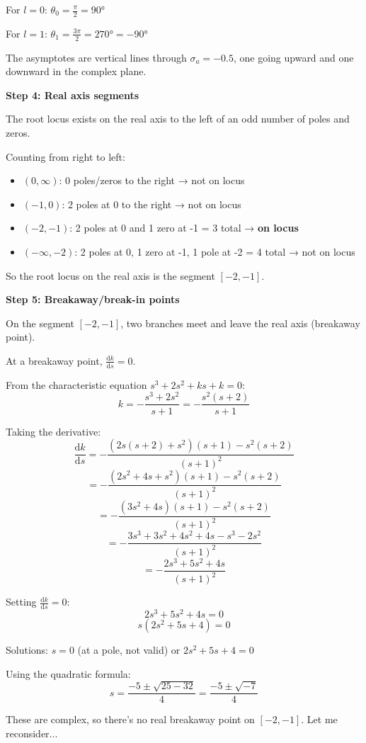 \documentclass[11pt,a4paper]{article}
\begin{document}
For $l = 0$: $\theta_0 = \frac{\pi}{2} = 90°$

For $l = 1$: $\theta_1 = \frac{3\pi}{2} = 270° = -90°$

The asymptotes are vertical lines through $\sigma_a = -0.5$, one going upward and one downward in the complex plane.

\textbf{Step 4: Real axis segments}

The root locus exists on the real axis to the left of an odd number of poles and zeros.

Counting from right to left:
\begin{itemize}
\item $(0, \infty)$: 0 poles/zeros to the right → not on locus
\item $(-1, 0)$: 2 poles at 0 to the right → not on locus
\item $(-2, -1)$: 2 poles at 0 and 1 zero at -1 = 3 total → \textbf{on locus}
\item $(-\infty, -2)$: 2 poles at 0, 1 zero at -1, 1 pole at -2 = 4 total → not on locus
\end{itemize}

So the root locus on the real axis is the segment $[-2, -1]$.

\textbf{Step 5: Breakaway/break-in points}

On the segment $[-2, -1]$, two branches meet and leave the real axis (breakaway point).

At a breakaway point, $\frac{\mathrm{d}k}{\mathrm{d}s} = 0$.

From the characteristic equation $s^3 + 2s^2 + ks + k = 0$:
\[
k = -\frac{s^3 + 2s^2}{s + 1} = -\frac{s^2(s + 2)}{s + 1}
\]

Taking the derivative:
\[
\frac{\mathrm{d}k}{\mathrm{d}s} = -\frac{(2s(s+2) + s^2)(s+1) - s^2(s+2)}{(s+1)^2}
\]
\[
= -\frac{(2s^2 + 4s + s^2)(s+1) - s^2(s+2)}{(s+1)^2}
\]
\[
= -\frac{(3s^2 + 4s)(s+1) - s^2(s+2)}{(s+1)^2}
\]
\[
= -\frac{3s^3 + 3s^2 + 4s^2 + 4s - s^3 - 2s^2}{(s+1)^2}
\]
\[
= -\frac{2s^3 + 5s^2 + 4s}{(s+1)^2}
\]

Setting $\frac{\mathrm{d}k}{\mathrm{d}s} = 0$:
\[
2s^3 + 5s^2 + 4s = 0
\]
\[
s(2s^2 + 5s + 4) = 0
\]

Solutions: $s = 0$ (at a pole, not valid) or $2s^2 + 5s + 4 = 0$

Using the quadratic formula:
\[
s = \frac{-5 \pm \sqrt{25 - 32}}{4} = \frac{-5 \pm \sqrt{-7}}{4}
\]

These are complex, so there's no real breakaway point on $[-2, -1]$. Let me reconsider...
\end{document}
